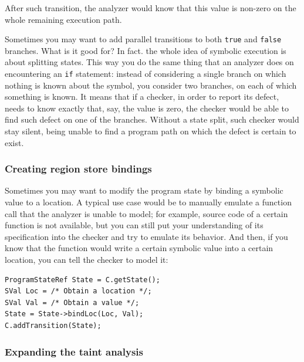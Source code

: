 \documentclass[a4paper,12pt]{article}
\newenvironment{nobr}{\begin{minipage}{\textwidth}\setlength\parskip{1em}
}{\end{minipage}\ignorespacesafterend}
\begin{document}
After such transition, the analyzer would know that this value is non-zero on the whole remaining execution path.

Sometimes you may want to add parallel transitions to both \lstinline|true| and \lstinline|false| branches. What is it good for? In fact. the whole idea of symbolic execution is about splitting states. This way you do the same thing that an analyzer does on encountering an \lstinline|if| statement: instead of considering a single branch on which nothing is known about the symbol, you consider two branches, on each of which something is known. It means that if a checker, in order to report its defect, needs to know exactly that, say, the value is zero, the checker would be able to find such defect on one of the branches. Without a state split, such checker would stay silent, being unable to find a program path on which the defect is certain to exist.

\begin{nobr}
\subsubsection{Creating region store bindings}

Sometimes you may want to modify the program state by binding a symbolic value to a location. A typical use case would be to manually emulate a function call that the analyzer is unable to model; for example, source code of a certain function is not available, but you can still put your understanding of its specification into the checker and try to emulate its behavior. And then, if you know that the function would write a certain symbolic value into a certain location, you can tell the checker to model it:

\begin{lstlisting}[style=cplusplus,numbers=none]
ProgramStateRef State = C.getState();
SVal Loc = /* Obtain a location */;
SVal Val = /* Obtain a value */;
State = State->bindLoc(Loc, Val);
C.addTransition(State);
\end{lstlisting}
\end{nobr}

\subsubsection{Expanding the taint analysis}\label{subsubsec:taint_2}
\end{document}
